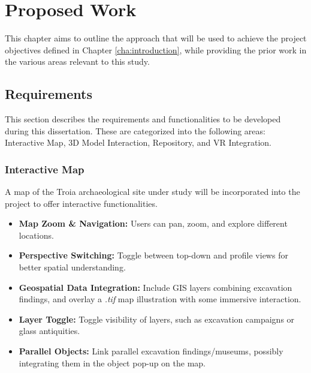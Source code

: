 
%

\chapter{Proposed Work}
\label{cha:proposed_work}

This chapter aims to outline the approach that will be used to achieve the project objectives defined in Chapter \ref{cha:introduction}, while providing the prior work in the various areas relevant to this study.

\section{Requirements}
\label{sec:requirements}

This section describes the requirements and functionalities to be developed during this dissertation. These are categorized into the following areas: Interactive Map, \gls{3D} Model Interaction, Repository, and \gls{VR} Integration.

\subsection*{Interactive Map}
A map of the Troia archaeological site under study will be incorporated into the project to offer interactive functionalities.
\begin{itemize}
    \item \textbf{Map Zoom \& Navigation:} Users can pan, zoom, and explore different locations.
    \item \textbf{Perspective Switching:} Toggle between top-down and profile views for better spatial understanding.
    \item \textbf{Geospatial Data Integration:} Include \gls{GIS} layers combining excavation findings, and overlay a \textit{.tif} map illustration with some immersive interaction.
    \item \textbf{Layer Toggle:} Toggle visibility of layers, such as excavation campaigns or glass antiquities.
    \item \textbf{Parallel Objects:} Link parallel excavation findings/museums, possibly integrating them in the object pop-up on the map.
\end{itemize}

